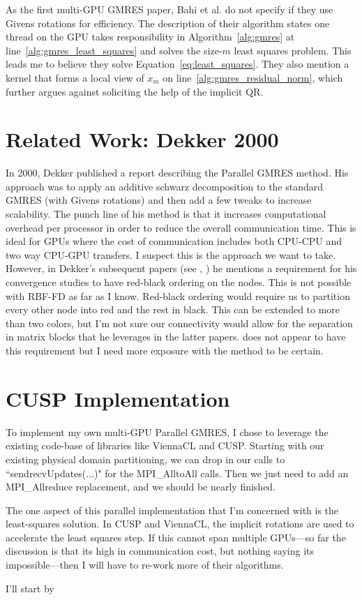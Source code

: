 As the first multi-GPU GMRES paper, Bahi et al. \cite{Bahi2011} do not specify if they use Givens rotations for efficiency. The description of their algorithm states one thread on the GPU takes responsibility in Algorithm~\ref{alg:gmres} at line~\ref{alg:gmres_least_squares} and solves the size-$m$ least squares problem. This leads me to believe they solve Equation~\ref{eq:least_squares}. They also mention a kernel that forms a local view of $x_m$ on line~\ref{alg:gmres_residual_norm}, which further argues against soliciting the help of the implicit QR.  


\section{Related Work: Dekker 2000}
In 2000, Dekker \cite{Dekker2000} published a report describing the Parallel GMRES method. His approach was to apply an additive schwarz decomposition to the standard GMRES (with Givens rotations) and then add a few tweaks to increase scalability. The punch line of his method is that it increases computational overhead per processor in order to reduce the overall communication time. This is ideal for GPUs where the cost of communication includes both CPU-CPU and two way CPU-GPU transfers. I suspect this is the approach we want to take. However, in Dekker's subsequent papers (see \cite{Dekker2001}, \cite{Dekker2005}) he mentions a requirement for his convergence studies to have red-black ordering on the nodes. This is not possible with RBF-FD as far as I know. Red-black ordering would require us to partition every other node into red and the rest in black. This can be extended to more than two colors, but I'm not sure our connectivity would allow for the separation in matrix blocks that he leverages in the latter papers. \cite{Dekker2000} does not appear to have this requirement but I need more exposure with the method to be certain.  


\section{CUSP Implementation} 

To implement my own multi-GPU Parallel GMRES, I chose to leverage the existing code-base of libraries like ViennaCL and CUSP. Starting with our existing physical domain partitioning, we can drop in our calls to ``sendrecvUpdates(...)" for the MPI\_AlltoAll calls. Then we just need to add an MPI\_Allreduce replacement, and we should be nearly finished. 

The one aspect of this parallel implementation that I'm concerned with is the least-squares solution. In CUSP and ViennaCL, the implicit rotations are used to accelerate the least squares step. If this cannot span multiple GPUs---so far the discussion is that its high in communication cost, but nothing saying its impossible---then I will have to re-work more of their algorithms. 

I'll start by 

